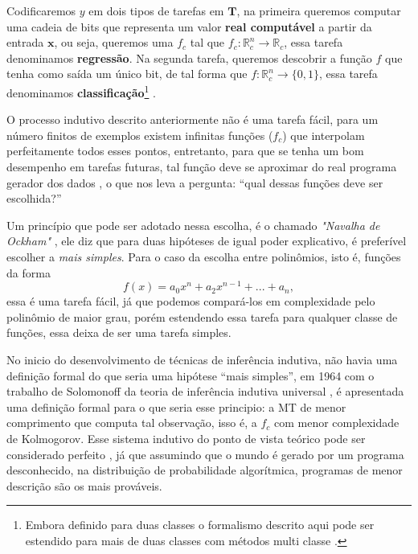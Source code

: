 Codificaremos $y$ em dois tipos de tarefas em $\boldsymbol{T}$, na primeira
queremos computar uma cadeia de bits que representa um valor \textbf{real
computável} a partir da entrada $\boldsymbol{x}$, ou seja, queremos uma $f_c$
tal que $f_c:\mathbb{R}_c^n\longrightarrow \mathbb{R}_c$, essa tarefa
denominamos \textbf{regressão}. Na segunda tarefa, queremos descobrir a função
$f$ que tenha como saída um único bit, de tal forma que
$f:\mathbb{R}_c^n\longrightarrow \{0,1\}$, essa tarefa denominamos
\textbf{classificação}\footnote{Embora definido para duas classes o formalismo
descrito aqui pode ser estendido para mais de duas classes com métodos
multi classe \cite{abu2012learning}.} \cite{goodfellow2016deep,
mohri2018foundations}.

O processo indutivo descrito anteriormente não é uma tarefa fácil,
para um número finitos de exemplos existem infinitas funções ($f_c$) que
interpolam perfeitamente todos esses
pontos\cite{bishop2006pattern,abu2012learning}, entretanto, para que se tenha
um bom desempenho em tarefas futuras, tal função deve se aproximar do real
programa gerador dos dados
\cite{mohri2018foundations,goodfellow2016deep,solomonoff1964formal,kearns1994introduction},
o que nos leva a pergunta: ``qual dessas funções deve ser escolhida?''

Um princípio que pode ser adotado nessa escolha, é o chamado \textit{"Navalha
de Ockham"} \cite{blumer1987occam}, ele diz que para duas hipóteses de igual
poder explicativo, é preferível escolher a \textit{mais simples}. Para o caso
da escolha entre polinômios, isto é, funções da forma
\[f(x) = a_0x^n+a_2x^{n-1}+...+a_n,\]
essa é uma tarefa fácil, já que podemos compará-los em complexidade pelo
polinômio de maior grau, porém estendendo essa tarefa para qualquer classe de
funções, essa deixa de ser uma tarefa simples.

No inicio do desenvolvimento de técnicas de inferência indutiva, não havia uma
definição formal do que seria uma hipótese ``mais simples'', em 1964 com o
trabalho de Solomonoff da teoria de inferência indutiva universal
\cite{solomonoff1964formal}, é apresentada uma definição formal para o que
seria esse principio: a MT de menor comprimento que computa tal observação,
isso é, a $f_c$ com menor complexidade de Kolmogorov. Esse sistema indutivo do
ponto de vista teórico pode ser considerado perfeito \cite{li1992inductive}, já
que assumindo que o mundo é gerado por um programa desconhecido, na
distribuição de probabilidade algorítmica, programas de menor descrição são os
mais prováveis.

